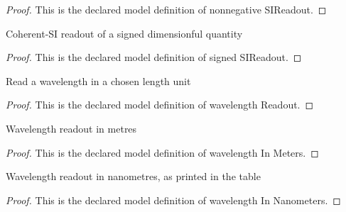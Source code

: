\begin{proof}
  This is the declared model definition of nonnegative SIReadout.
\end{proof}
\begin{definition}
  \label{def:physics:phyx-mini-0516:phyxminiproblems-problemphyxmini0516-signedsireadout}
  Coherent-SI readout of a signed dimensionful quantity
\end{definition}
\begin{proof}
  This is the declared model definition of signed SIReadout.
\end{proof}
\begin{definition}
  \label{def:physics:phyx-mini-0516:phyxminiproblems-problemphyxmini0516-wavelengthreadout}
  Read a wavelength in a chosen length unit
\end{definition}
\begin{proof}
  This is the declared model definition of wavelength Readout.
\end{proof}
\begin{definition}
  \label{def:physics:phyx-mini-0516:phyxminiproblems-problemphyxmini0516-wavelengthinmeters}
  Wavelength readout in metres
\end{definition}
\begin{proof}
  This is the declared model definition of wavelength In Meters.
\end{proof}
\begin{definition}
  \label{def:physics:phyx-mini-0516:phyxminiproblems-problemphyxmini0516-wavelengthinnanometers}
  Wavelength readout in nanometres, as printed in the table
\end{definition}
\begin{proof}
  This is the declared model definition of wavelength In Nanometers.
\end{proof}
